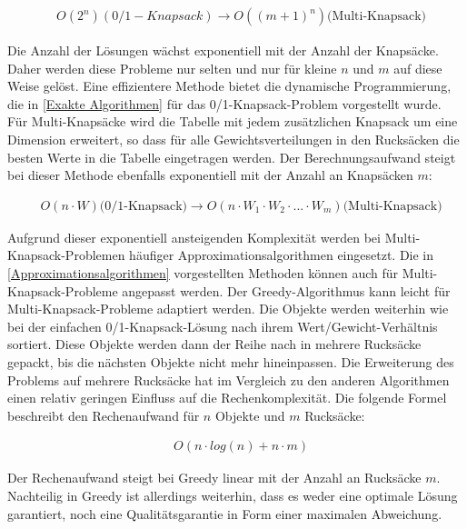 \begin{align}
    & O(2^n) (0/1-Knapsack) \rightarrow O((m+1)^n) \text{(Multi-Knapsack)}
\end{align}

Die Anzahl der Lösungen wächst exponentiell mit der Anzahl der Knapsäcke. Daher werden diese Probleme nur selten und nur für kleine $ n $ und $ m $ auf diese Weise gelöst. Eine effizientere Methode bietet die dynamische Programmierung, die in \autoref{Exakte Algorithmen} für das 0/1-Knapsack-Problem vorgestellt wurde. Für Multi-Knapsäcke wird die Tabelle mit jedem zusätzlichen Knapsack um eine Dimension erweitert, so dass für alle Gewichtsverteilungen in den Rucksäcken die besten Werte in die Tabelle eingetragen werden. Der Berechnungsaufwand steigt bei dieser Methode ebenfalls exponentiell mit der Anzahl an Knapsäcken $ m $:

\begin{align}
    & O(n \cdot W) \text{(0/1-Knapsack)} \rightarrow O(n \cdot W_1 \cdot W_2 \cdot ... \cdot W_m) \text{(Multi-Knapsack)}
\end{align}

Aufgrund dieser exponentiell ansteigenden Komplexität werden bei Multi-Knapsack-Problemen häufiger Approximationsalgorithmen eingesetzt. Die in \autoref{Approximationsalgorithmen} vorgestellten Methoden können auch für Multi-Knapsack-Probleme angepasst werden. Der Greedy-Algorithmus kann leicht für Multi-Knapsack-Probleme adaptiert werden. Die Objekte werden weiterhin wie bei der einfachen 0/1-Knapsack-Lösung nach ihrem Wert/Gewicht-Verhältnis sortiert. Diese Objekte werden dann der Reihe nach in mehrere Rucksäcke gepackt, bis die nächsten Objekte nicht mehr hineinpassen. Die Erweiterung des Problems auf mehrere Rucksäcke hat im Vergleich zu den anderen Algorithmen einen relativ geringen Einfluss auf die Rechenkomplexität. Die folgende Formel beschreibt den Rechenaufwand für $ n $ Objekte und $ m $ Rucksäcke:

\begin{align}
    & O(n \cdot log(n) + n \cdot m)
\end{align}

Der Rechenaufwand steigt bei Greedy linear mit der Anzahl an Rucksäcke $ m $. Nachteilig in Greedy ist allerdings weiterhin, dass es weder eine optimale Lösung garantiert, noch eine Qualitätsgarantie in Form einer maximalen Abweichung. 

